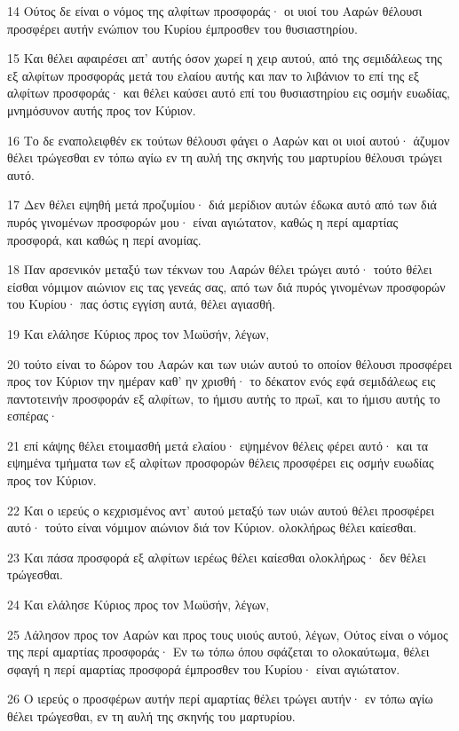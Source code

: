 \par 14 Ούτος δε είναι ο νόμος της αλφίτων προσφοράς· οι υιοί του Ααρών θέλουσι προσφέρει αυτήν ενώπιον του Κυρίου έμπροσθεν του θυσιαστηρίου.
\par 15 Και θέλει αφαιρέσει απ' αυτής όσον χωρεί η χειρ αυτού, από της σεμιδάλεως της εξ αλφίτων προσφοράς μετά του ελαίου αυτής και παν το λιβάνιον το επί της εξ αλφίτων προσφοράς· και θέλει καύσει αυτό επί του θυσιαστηρίου εις οσμήν ευωδίας, μνημόσυνον αυτής προς τον Κύριον.
\par 16 Το δε εναπολειφθέν εκ τούτων θέλουσι φάγει ο Ααρών και οι υιοί αυτού· άζυμον θέλει τρώγεσθαι εν τόπω αγίω εν τη αυλή της σκηνής του μαρτυρίου θέλουσι τρώγει αυτό.
\par 17 Δεν θέλει εψηθή μετά προζυμίου· διά μερίδιον αυτών έδωκα αυτό από των διά πυρός γινομένων προσφορών μου· είναι αγιώτατον, καθώς η περί αμαρτίας προσφορά, και καθώς η περί ανομίας.
\par 18 Παν αρσενικόν μεταξύ των τέκνων του Ααρών θέλει τρώγει αυτό· τούτο θέλει είσθαι νόμιμον αιώνιον εις τας γενεάς σας, από των διά πυρός γινομένων προσφορών του Κυρίου· πας όστις εγγίση αυτά, θέλει αγιασθή.
\par 19 Και ελάλησε Κύριος προς τον Μωϋσήν, λέγων,
\par 20 τούτο είναι το δώρον του Ααρών και των υιών αυτού το οποίον θέλουσι προσφέρει προς τον Κύριον την ημέραν καθ' ην χρισθή· το δέκατον ενός εφά σεμιδάλεως εις παντοτεινήν προσφοράν εξ αλφίτων, το ήμισυ αυτής το πρωΐ, και το ήμισυ αυτής το εσπέρας·
\par 21 επί κάψης θέλει ετοιμασθή μετά ελαίου· εψημένον θέλεις φέρει αυτό· και τα εψημένα τμήματα των εξ αλφίτων προσφορών θέλεις προσφέρει εις οσμήν ευωδίας προς τον Κύριον.
\par 22 Και ο ιερεύς ο κεχρισμένος αντ' αυτού μεταξύ των υιών αυτού θέλει προσφέρει αυτό· τούτο είναι νόμιμον αιώνιον διά τον Κύριον. ολοκλήρως θέλει καίεσθαι.
\par 23 Και πάσα προσφορά εξ αλφίτων ιερέως θέλει καίεσθαι ολοκλήρως· δεν θέλει τρώγεσθαι.
\par 24 Και ελάλησε Κύριος προς τον Μωϋσήν, λέγων,
\par 25 Λάλησον προς τον Ααρών και προς τους υιούς αυτού, λέγων, Ούτος είναι ο νόμος της περί αμαρτίας προσφοράς· Εν τω τόπω όπου σφάζεται το ολοκαύτωμα, θέλει σφαγή η περί αμαρτίας προσφορά έμπροσθεν του Κυρίου· είναι αγιώτατον.
\par 26 Ο ιερεύς ο προσφέρων αυτήν περί αμαρτίας θέλει τρώγει αυτήν· εν τόπω αγίω θέλει τρώγεσθαι, εν τη αυλή της σκηνής του μαρτυρίου.
